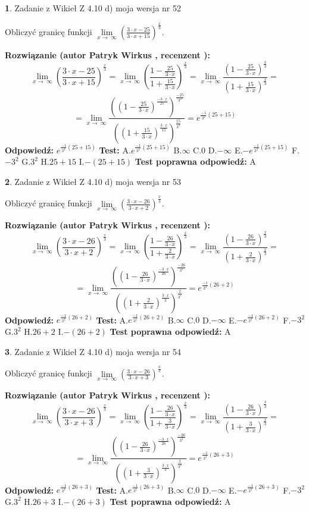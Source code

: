 \documentclass[12pt, a4paper]{article}
\theoremstyle{definition} %
\newtheorem{zad}{}
\newcommand{\zadStart}[1]{\begin{zad}#1\newline}
\newcommand{\zadStop}{\end{zad}}
\newcommand{\rozwStart}[2]{\noindent \textbf{Rozwiązanie (autor #1 , recenzent #2): }\newline}
\newcommand{\rozwStop}{\newline}
\newcommand{\odpStart}{\noindent \textbf{Odpowiedź:}\newline}
\newcommand{\odpStop}{\newline}
\newcommand{\testStart}{\noindent \textbf{Test:}\newline}
\newcommand{\testStop}{\newline}
\newcommand{\kluczStart}{\noindent \textbf{Test poprawna odpowiedź:}\newline}
\newcommand{\kluczStop}{\newline}
\begin{document}
\zadStart{Zadanie z Wikieł Z 4.10 d) moja wersja nr 52}


Obliczyć granicę funkcji  $\lim\limits_{x\to\ \infty}(\frac{3\cdot x-25}{3\cdot x+15})^{\frac{x}{3}}$.
\zadStop
\rozwStart{Patryk Wirkus}{}
$$\lim\limits_{x\to\ \infty}(\frac{3\cdot x-25}{3\cdot x+15})^{\frac{x}{3}} = \lim\limits_{x\to\ \infty}(\frac{1-\frac{25}{3\cdot x}}{1+\frac{15}{3\cdot x}})^{\frac{x}{3}}=\lim\limits_{x\to\ \infty}\frac{(1-\frac{25}{3\cdot x})^{\frac{x}{3}}}{(1+\frac{15}{3\cdot x})^{\frac{x}{3}}}=$$
$$=\lim\limits_{x\to\ \infty}\frac{((1-\frac{25}{3\cdot x})^{\frac{-3\cdot x}{25}})^{\frac{-25}{3^{2}}}}{((1+\frac{15}{3\cdot x})^{\frac{3\cdot x}{15}})^{\frac{15}{3^{2}}}}=e^{\frac{-1}{3^{2}}(25+15)}$$
\rozwStop
\odpStart
$e^{\frac{-1}{3^{2}}(25+15)}$
\odpStop
\testStart
A.$e^{\frac{-1}{3^{2}}(25+15)}$ B.$\infty$ C.$0$ D.$-\infty$ E.$-e^{\frac{-1}{3^{2}}(25+15)}$
F.$-3^{2}$ G.$3^{2}$
H.$25+15$
I.$-(25+15)$
\testStop
\kluczStart
A
\kluczStop



\zadStart{Zadanie z Wikieł Z 4.10 d) moja wersja nr 53}


Obliczyć granicę funkcji  $\lim\limits_{x\to\ \infty}(\frac{3\cdot x-26}{3\cdot x+2})^{\frac{x}{3}}$.
\zadStop
\rozwStart{Patryk Wirkus}{}
$$\lim\limits_{x\to\ \infty}(\frac{3\cdot x-26}{3\cdot x+2})^{\frac{x}{3}} = \lim\limits_{x\to\ \infty}(\frac{1-\frac{26}{3\cdot x}}{1+\frac{2}{3\cdot x}})^{\frac{x}{3}}=\lim\limits_{x\to\ \infty}\frac{(1-\frac{26}{3\cdot x})^{\frac{x}{3}}}{(1+\frac{2}{3\cdot x})^{\frac{x}{3}}}=$$
$$=\lim\limits_{x\to\ \infty}\frac{((1-\frac{26}{3\cdot x})^{\frac{-3\cdot x}{26}})^{\frac{-26}{3^{2}}}}{((1+\frac{2}{3\cdot x})^{\frac{3\cdot x}{2}})^{\frac{2}{3^{2}}}}=e^{\frac{-1}{3^{2}}(26+2)}$$
\rozwStop
\odpStart
$e^{\frac{-1}{3^{2}}(26+2)}$
\odpStop
\testStart
A.$e^{\frac{-1}{3^{2}}(26+2)}$ B.$\infty$ C.$0$ D.$-\infty$ E.$-e^{\frac{-1}{3^{2}}(26+2)}$
F.$-3^{2}$ G.$3^{2}$
H.$26+2$
I.$-(26+2)$
\testStop
\kluczStart
A
\kluczStop



\zadStart{Zadanie z Wikieł Z 4.10 d) moja wersja nr 54}


Obliczyć granicę funkcji  $\lim\limits_{x\to\ \infty}(\frac{3\cdot x-26}{3\cdot x+3})^{\frac{x}{3}}$.
\zadStop
\rozwStart{Patryk Wirkus}{}
$$\lim\limits_{x\to\ \infty}(\frac{3\cdot x-26}{3\cdot x+3})^{\frac{x}{3}} = \lim\limits_{x\to\ \infty}(\frac{1-\frac{26}{3\cdot x}}{1+\frac{3}{3\cdot x}})^{\frac{x}{3}}=\lim\limits_{x\to\ \infty}\frac{(1-\frac{26}{3\cdot x})^{\frac{x}{3}}}{(1+\frac{3}{3\cdot x})^{\frac{x}{3}}}=$$
$$=\lim\limits_{x\to\ \infty}\frac{((1-\frac{26}{3\cdot x})^{\frac{-3\cdot x}{26}})^{\frac{-26}{3^{2}}}}{((1+\frac{3}{3\cdot x})^{\frac{3\cdot x}{3}})^{\frac{3}{3^{2}}}}=e^{\frac{-1}{3^{2}}(26+3)}$$
\rozwStop
\odpStart
$e^{\frac{-1}{3^{2}}(26+3)}$
\odpStop
\testStart
A.$e^{\frac{-1}{3^{2}}(26+3)}$ B.$\infty$ C.$0$ D.$-\infty$ E.$-e^{\frac{-1}{3^{2}}(26+3)}$
F.$-3^{2}$ G.$3^{2}$
H.$26+3$
I.$-(26+3)$
\testStop
\kluczStart
A
\kluczStop
\end{document}
